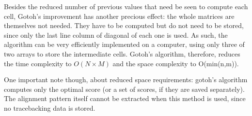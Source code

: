 Besides the reduced number of previous values that need be seen to compute each cell, Gotoh's improvement has another precious effect: the whole matrices are themselves not needed. They have to be computed but do not need to be stored, since only the last line column of diagonal of each one is used. As such, the algorithm can be very efficiently implemented on a computer, using only three of two arrays to store the intermediate cells. Gotoh's algorithm, therefore, reduces the time complexity to $O(N \times M)$ and the space complexity to O(min(n,m)).

One important note though, about reduced space requirements: gotoh's algorithm computes only the optimal score (or a set of scores, if they are saved separately). The alignment pattern itself cannot be extracted when this method is used, since no tracebacking data is stored.

